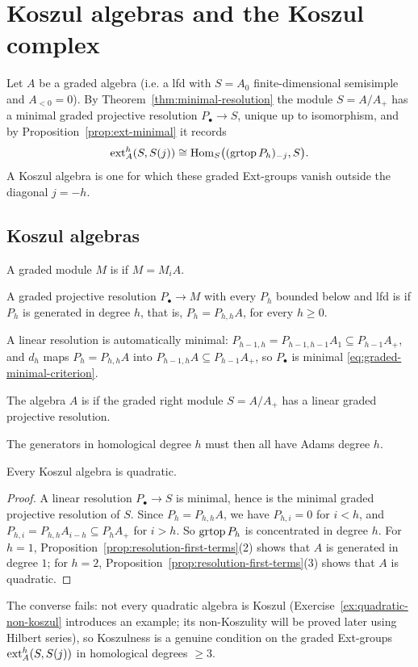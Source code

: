 \clearpage
\section{Koszul algebras and the Koszul complex}\label{sec:koszul-complex}

Let $A$ be a graded algebra (i.e. a lfd with $S=A_0$ finite-dimensional semisimple and $A_{<0}=0$).
By Theorem~\ref{thm:minimal-resolution} the module $S=A/A_+$ has a minimal graded projective resolution $P_\bullet\to S$, unique up to isomorphism, and by Proposition~\ref{prop:ext-minimal} it records
\[
\operatorname{ext}\nolimits_A^h(S,S(j))\cong\operatorname{Hom}\nolimits_S\bigl((\operatorname{grtop}\nolimits P_h)_{-j},S\bigr).
\]
A Koszul algebra is one for which these graded Ext-groups vanish outside the diagonal $j=-h$.

\subsection{Koszul algebras}


\begin{definition}\label{def:linear-resolution}
A graded module $M$ is  if $M=M_iA$.

A graded projective resolution $P_\bullet\to M$ with every $P_h$ bounded below and lfd is  if $P_h$ is generated in degree $h$, that is, $P_h=P_{h,h}A$, for every $h\geq0$.
\end{definition}

A linear resolution is automatically minimal: $P_{h-1,h}=P_{h-1,h-1}A_1\subseteq P_{h-1}A_+$, and $d_h$ maps $P_h=P_{h,h}A$ into $P_{h-1,h}A\subseteq P_{h-1}A_+$, so $P_\bullet$ is minimal \eqref{eq:graded-minimal-criterion}.

\begin{definition}\label{def:koszul-algebra}
The algebra $A$ is  if the graded right module $S=A/A_+$ has a linear graded projective resolution.
\end{definition}

The generators in homological degree $h$ must then all have Adams degree $h$.

\begin{corollary}\label{cor:koszul-quadratic}
Every Koszul algebra is quadratic.
\end{corollary}

\begin{proof}
A linear resolution $P_\bullet\to S$ is minimal, hence is the minimal graded projective resolution of $S$.
Since $P_h=P_{h,h}A$, we have $P_{h,i}=0$ for $i<h$, and $P_{h,i}=P_{h,h}A_{i-h}\subseteq P_hA_+$ for $i>h$.
So $\operatorname{grtop}\nolimits P_h$ is concentrated in degree $h$.
For $h=1$, Proposition~\ref{prop:resolution-first-terms}(2) shows that $A$ is generated in degree $1$; for $h=2$, Proposition~\ref{prop:resolution-first-terms}(3) shows that $A$ is quadratic.
\end{proof}
The converse fails: not every quadratic algebra is Koszul (Exercise~\ref{ex:quadratic-non-koszul} introduces an example; its non-Koszulity will be proved later using Hilbert series), so Koszulness is a genuine condition on the graded Ext-groups $\operatorname{ext}\nolimits_A^h(S,S(j))$ in homological degrees $\geq3$.


